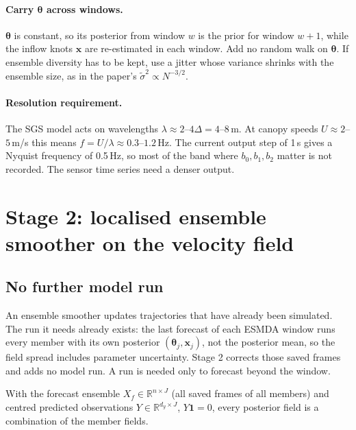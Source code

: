 \documentclass[11pt,a4paper]{article}
\newcommand{\R}{\mathbb{R}}
\begin{document}
\paragraph{Carry $\bm\theta$ across windows.} $\bm\theta$ is constant, so its
posterior from window $w$ is the prior for window $w+1$, while the inflow
knots $\bm x$ are re-estimated in each window. Add no random walk on
$\bm\theta$. If ensemble diversity has to be kept, use a jitter whose
variance shrinks with the ensemble size, as in the paper's
$\tilde\sigma^2 \propto N^{-3/2}$.

\paragraph{Resolution requirement.} The SGS model acts on wavelengths
$\lambda \approx 2$--$4\Delta = 4$--$8$\,m. At canopy speeds $U \approx 2$--$5$\,m/s
this means $f = U/\lambda \approx 0.3$--$1.2$\,Hz. The current output step of
1\,s gives a Nyquist frequency of 0.5\,Hz, so most of the band where
$b_0, b_1, b_2$ matter is not recorded. The sensor time series need a denser
output.

\section{Stage 2: localised ensemble smoother on the velocity field}

\subsection{No further model run}
An ensemble smoother updates trajectories that have already been simulated.
The run it needs already exists: the last forecast of each ESMDA window runs
every member with its own posterior $(\bm\theta_j, \bm x_j)$, not the posterior
mean, so the field spread includes parameter uncertainty. Stage 2 corrects those
saved frames and adds no model run. A run is needed only to forecast beyond the
window.

With the forecast ensemble $X_f \in \R^{n\times J}$ (all saved frames of all
members) and centred predicted observations $Y \in \R^{d_y\times J}$,
$Y\bm 1 = 0$, every posterior field is a combination of the member fields.
\end{document}
